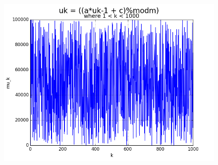 \documentclass[a4paper,10pt]{article}
\begin{document}
\begin{center}
 \begin{figure}[!hbt]
  \includegraphics[scale=0.573]{figure_2.png}
 \end{figure}
\end{center}
\end{document}
